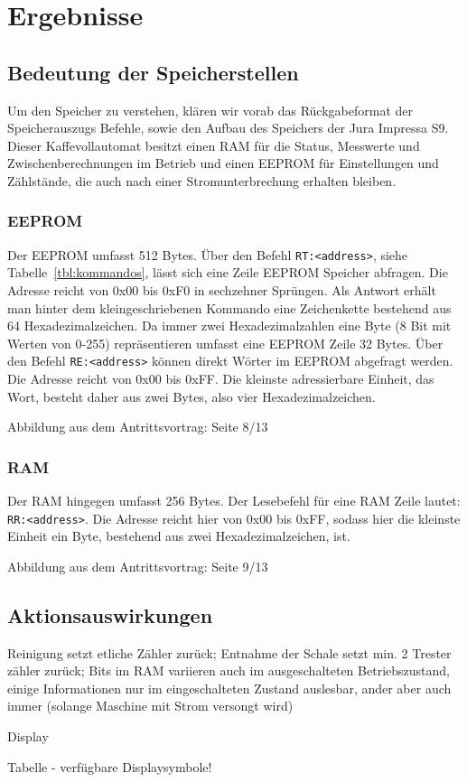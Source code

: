 \chapter{Ergebnisse}

\section{Bedeutung der Speicherstellen}




Um den Speicher zu verstehen, klären wir vorab das Rückgabeformat der Speicherauszugs Befehle, sowie den Aufbau des Speichers der Jura Impressa S9.
Dieser Kaffevollautomat besitzt einen \ac{RAM} für die Status, Messwerte und Zwischenberechnungen im Betrieb und einen \ac{EEPROM} für Einstellungen und Zählstände, die auch nach einer Stromunterbrechung erhalten bleiben.

\subsection{EEPROM}
Der \acf{EEPROM} umfasst 512 Bytes.
Über den Befehl \texttt{RT:<address>}, siehe Tabelle~\ref{tbl:kommandos}, lässt sich eine Zeile \ac{EEPROM} Speicher abfragen.
Die Adresse reicht von 0x00 bis 0xF0 in sechzehner Sprüngen.
Als Antwort erhält man hinter dem kleingeschriebenen Kommando eine Zeichenkette bestehend aus 64 Hexadezimalzeichen.
Da immer zwei Hexadezimalzahlen eine Byte (8 Bit mit Werten von 0-255) repräsentieren umfasst eine \ac{EEPROM} Zeile 32 Bytes.
Über den Befehl \texttt{RE:<address>} können direkt Wörter im \ac{EEPROM} abgefragt werden. Die Adresse reicht von 0x00 bis 0xFF. Die kleinste adressierbare Einheit, das Wort, besteht daher aus zwei Bytes, also vier Hexadezimalzeichen.

\todo Abbildung aus dem Antrittsvortrag: Seite 8/13

\subsection{RAM}
Der \acf{RAM} hingegen umfasst 256 Bytes.
Der Lesebefehl für eine \ac{RAM} Zeile lautet: \texttt{RR:<address>}. Die Adresse reicht hier von 0x00 bis 0xFF, sodass hier die kleinste Einheit ein Byte, bestehend aus zwei Hexadezimalzeichen, ist.

\todo Abbildung aus dem Antrittsvortrag: Seite 9/13


\section{Aktionsauswirkungen}
Reinigung setzt etliche Zähler zurück; Entnahme der Schale setzt min. 2 Trester zähler zurück; Bits im RAM variieren auch im ausgeschalteten Betriebszustand, einige Informationen nur im eingeschalteten Zustand auslesbar, ander aber auch immer (solange Maschine mit Strom versongt wird)







\todo
Display

Tabelle - verfügbare Displaysymbole!
\label{tbl:Displaysymbole}
